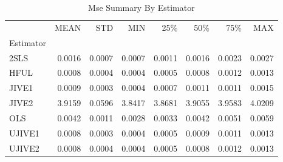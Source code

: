\begin{table}[ht]
\centering
\caption{Mse Summary By Estimator}
\begin{tabular}{lrrrrrrr}
\toprule
 & MEAN & STD & MIN & 25\% & 50\% & 75\% & MAX \\
Estimator &  &  &  &  &  &  &  \\
\midrule
2SLS & 0.0016 & 0.0007 & 0.0007 & 0.0011 & 0.0016 & 0.0023 & 0.0027 \\
HFUL & 0.0008 & 0.0004 & 0.0004 & 0.0005 & 0.0008 & 0.0012 & 0.0013 \\
JIVE1 & 0.0009 & 0.0003 & 0.0004 & 0.0007 & 0.0011 & 0.0011 & 0.0015 \\
JIVE2 & 3.9159 & 0.0596 & 3.8417 & 3.8681 & 3.9055 & 3.9583 & 4.0209 \\
OLS & 0.0042 & 0.0011 & 0.0028 & 0.0033 & 0.0042 & 0.0051 & 0.0059 \\
UJIVE1 & 0.0008 & 0.0003 & 0.0004 & 0.0005 & 0.0009 & 0.0011 & 0.0013 \\
UJIVE2 & 0.0008 & 0.0004 & 0.0004 & 0.0005 & 0.0008 & 0.0012 & 0.0013 \\
\bottomrule
\end{tabular}
\end{table}

